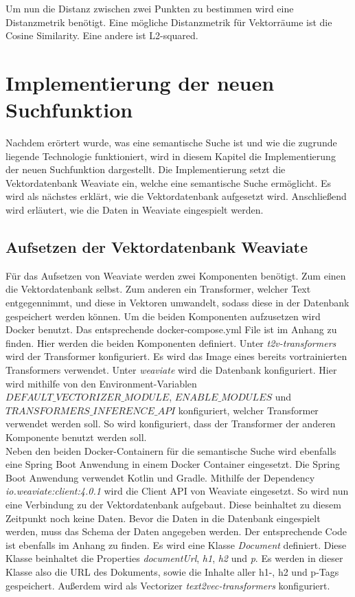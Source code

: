 Um nun die Distanz zwischen zwei Punkten zu bestimmen wird eine Distanzmetrik benötigt.
Eine mögliche Distanzmetrik für Vektorräume ist die Cosine Similarity.
Eine andere ist L2-squared.

\section{Implementierung der neuen Suchfunktion}
\label{chap:implementierung}
Nachdem erörtert wurde, was eine semantische Suche ist und wie die zugrunde liegende Technologie funktioniert, wird in diesem Kapitel die Implementierung der neuen Suchfunktion dargestellt.
Die Implementierung setzt die Vektordatenbank Weaviate ein, welche eine semantische Suche ermöglicht.
Es wird als nächstes erklärt, wie die Vektordatenbank aufgesetzt wird.
Anschließend wird erläutert, wie die Daten in Weaviate eingespielt werden.

\subsection{Aufsetzen der Vektordatenbank Weaviate}
Für das Aufsetzen von Weaviate werden zwei Komponenten benötigt.
Zum einen die Vektordatenbank selbst.
Zum anderen ein Transformer, welcher Text entgegennimmt, und diese in Vektoren umwandelt, sodass diese in der Datenbank gespeichert werden können.
Um die beiden Komponenten aufzusetzen wird Docker benutzt.
Das entsprechende docker-compose.yml File ist im Anhang zu finden.
Hier werden die beiden Komponenten definiert.
Unter \textit{t2v-transformers} wird der Transformer konfiguriert.
Es wird das Image eines bereits vortrainierten Transformers verwendet.
Unter \textit{weaviate} wird die Datenbank konfiguriert.
Hier wird mithilfe von den Environment-Variablen \textit{$DEFAULT\_VECTORIZER\_MODULE$}, \textit{$ENABLE\_MODULES$} und \textit{$TRANSFORMERS\_INFERENCE\_API$} konfiguriert, welcher Transformer verwendet werden soll.
So wird konfiguriert, dass der Transformer der anderen Komponente benutzt werden soll.\\

Neben den beiden Docker-Containern für die semantische Suche wird ebenfalls eine Spring Boot Anwendung in einem Docker Container eingesetzt.
Die Spring Boot Anwendung verwendet Kotlin und Gradle.
Mithilfe der Dependency \textit{io.weaviate:client:4.0.1} wird die Client API von Weaviate eingesetzt.
So wird nun eine Verbindung zu der Vektordatenbank aufgebaut.
Diese beinhaltet zu diesem Zeitpunkt noch keine Daten.
Bevor die Daten in die Datenbank eingespielt werden, muss das Schema der Daten angegeben werden.
Der entsprechende Code ist ebenfalls im Anhang zu finden.
Es wird eine Klasse \textit{Document} definiert.
Diese Klasse beinhaltet die Properties \textit{documentUrl}, \textit{h1}, \textit{h2} und \textit{p}.
Es werden in dieser Klasse also die URL des Dokuments, sowie die Inhalte aller h1-, h2 und p-Tags gespeichert.
Außerdem wird als Vectorizer \textit{text2vec-transformers} konfiguriert.\\

